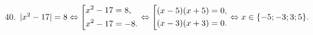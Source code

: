 40. $|x^2-17|=8\Leftrightarrow\left[\begin{gathered} x^2-17=8,\hfill\\
      x^2-17=-8.\hfill \end{gathered}\right.\Leftrightarrow\left[\begin{gathered} (x-5)(x+5)=0,\hfill\\
      (x-3)(x+3)=0.\hfill \end{gathered}\right. \Leftrightarrow x\in\{-5; -3; 3; 5\}.$\\
